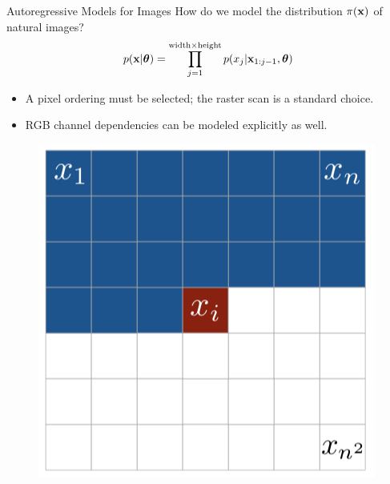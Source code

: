 \documentclass{beamer}
\begin{document}
\begin{frame}{Autoregressive Models for Images}
	How do we model the distribution $\pi(\mathbf{x})$ of natural images?
	$$
  		p(\mathbf{x} | \boldsymbol{\theta}) = \prod_{j=1}^{\text{width} \times \text{height}} p(x_j | \mathbf{x}_{1:j-1}, \boldsymbol{\theta})
	$$
	\begin{minipage}[t]{0.5\columnwidth}
		\vspace{0.5cm}
		\begin{itemize}
			\item A pixel ordering must be selected; the raster scan is a standard choice.
		    \item RGB channel dependencies can be modeled explicitly as well.
		\end{itemize}
	\end{minipage}%
	\begin{minipage}[t]{0.5\columnwidth}
		\begin{figure}
			\centering
   			\includegraphics[width=0.9\linewidth]{figs/pixelcnn1.png}
		\end{figure}
	\end{minipage}
\end{frame}
\end{document}
